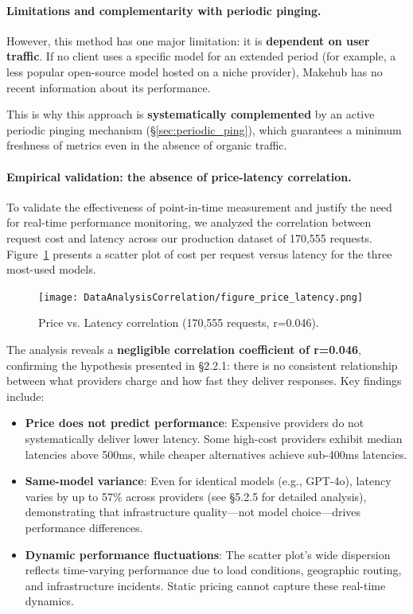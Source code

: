 \documentclass[english]{article}
\begin{document}
\paragraph{Limitations and complementarity with periodic pinging.}

However, this method has one major limitation: it is \textbf{dependent on user traffic}. If no client uses a specific model for an extended period (for example, a less popular open-source model hosted on a niche provider), Makehub has no recent information about its performance.

This is why this approach is \textbf{systematically complemented} by an active periodic pinging mechanism (\S\ref{sec:periodic_ping}), which guarantees a minimum freshness of metrics even in the absence of organic traffic.

\paragraph{Empirical validation: the absence of price-latency correlation.}

To validate the effectiveness of point-in-time measurement and justify the need for real-time performance monitoring, we analyzed the correlation between request cost and latency across our production dataset of 170,555 requests. Figure~\ref{fig:price_latency_correlation} presents a scatter plot of cost per request versus latency for the three most-used models.

\begin{figure}[H]
\centering
\texttt{[image: DataAnalysisCorrelation/figure\_price\_latency.png]}
\caption{Price vs. Latency correlation (170,555 requests, r=0.046).}
\label{fig:price_latency_correlation}
\end{figure}

The analysis reveals a \textbf{negligible correlation coefficient of r=0.046}, confirming the hypothesis presented in §2.2.1: there is no consistent relationship between what providers charge and how fast they deliver responses. Key findings include:

\begin{itemize}
    \item \textbf{Price does not predict performance}: Expensive providers do not systematically deliver lower latency. Some high-cost providers exhibit median latencies above 500ms, while cheaper alternatives achieve sub-400ms latencies.
    \item \textbf{Same-model variance}: Even for identical models (e.g., GPT-4o), latency varies by up to 57\% across providers (see §5.2.5 for detailed analysis), demonstrating that infrastructure quality—not model choice—drives performance differences.
    \item \textbf{Dynamic performance fluctuations}: The scatter plot's wide dispersion reflects time-varying performance due to load conditions, geographic routing, and infrastructure incidents. Static pricing cannot capture these real-time dynamics.
\end{itemize}
\end{document}
